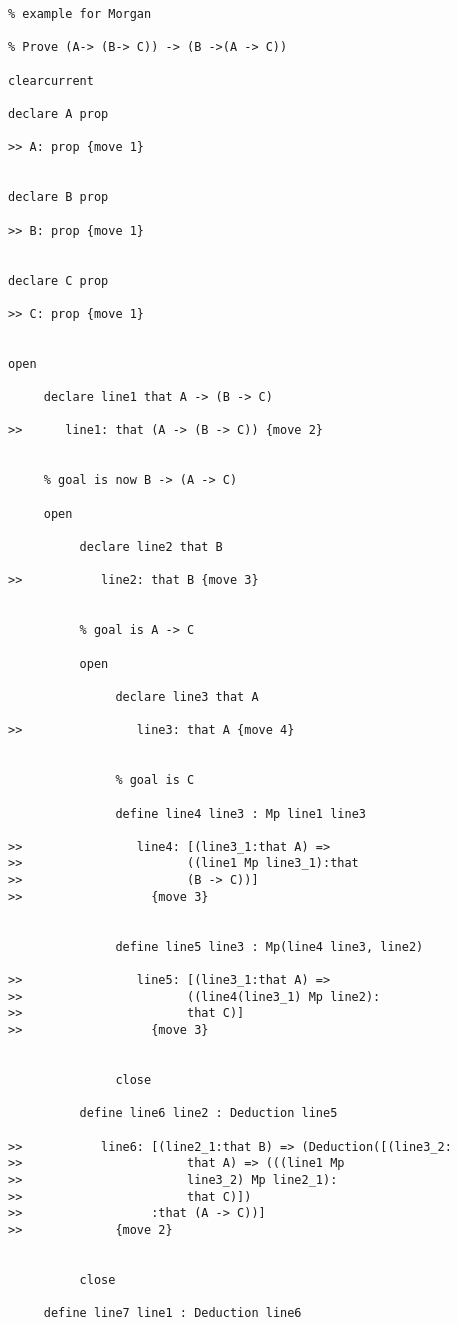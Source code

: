 \documentclass[12pt]{article}
\begin{document}
\begin{verbatim}
% example for Morgan

% Prove (A-> (B-> C)) -> (B ->(A -> C))

clearcurrent

declare A prop

>> A: prop {move 1}


declare B prop

>> B: prop {move 1}


declare C prop

>> C: prop {move 1}


open

     declare line1 that A -> (B -> C)

>>      line1: that (A -> (B -> C)) {move 2}


     % goal is now B -> (A -> C)

     open

          declare line2 that B

>>           line2: that B {move 3}


          % goal is A -> C

          open

               declare line3 that A

>>                line3: that A {move 4}


               % goal is C

               define line4 line3 : Mp line1 line3

>>                line4: [(line3_1:that A) => 
>>                       ((line1 Mp line3_1):that 
>>                       (B -> C))]
>>                  {move 3}


               define line5 line3 : Mp(line4 line3, line2)

>>                line5: [(line3_1:that A) => 
>>                       ((line4(line3_1) Mp line2):
>>                       that C)]
>>                  {move 3}


               close

          define line6 line2 : Deduction line5

>>           line6: [(line2_1:that B) => (Deduction([(line3_2:
>>                       that A) => (((line1 Mp 
>>                       line3_2) Mp line2_1):
>>                       that C)])
>>                  :that (A -> C))]
>>             {move 2}


          close

     define line7 line1 : Deduction line6


\end{verbatim}
\end{document}
